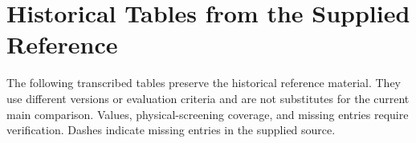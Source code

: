 \documentclass[10pt,twocolumn,letterpaper]{article}
\begin{document}
\section{Historical Tables from the Supplied Reference}
The following transcribed tables preserve the historical reference material. They use different versions or evaluation criteria and are not substitutes for the current main comparison. Values, physical-screening coverage, and missing entries require verification. Dashes indicate missing entries in the supplied source.

\end{document}
